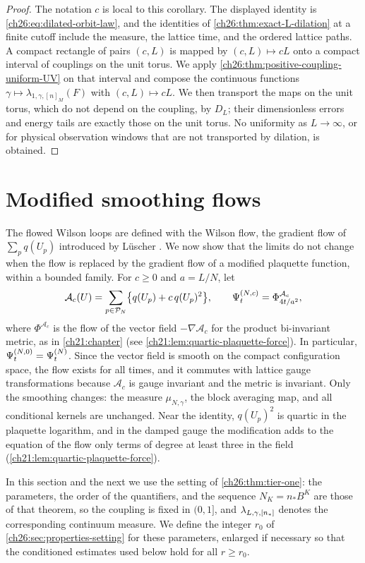 \begin{proof}
The notation $c$ is local to this corollary. The displayed identity is \eqref{ch26:eq:dilated-orbit-law}, and the identities of \cref{ch26:thm:exact-L-dilation} at a finite cutoff include the measure, the lattice time, and the ordered lattice paths. A compact rectangle of pairs $(c,L)$ is mapped by $(c,L)\mapsto cL$ onto a compact interval of couplings on the unit torus. We apply \cref{ch26:thm:positive-coupling-uniform-UV} on that interval and compose the continuous functions $\gamma\mapsto\lambda_{1,\gamma,[n]_M}(F)$ with $(c,L)\mapsto cL$. We then transport the maps on the unit torus, which do not depend on the coupling, by $D_L$; their dimensionless errors and energy tails are exactly those on the unit torus. No uniformity as $L\to\infty$, or for physical observation windows that are not transported by dilation, is obtained.
\end{proof}

\section{Modified smoothing flows}\label{ch26:sec:bounded-quartic-flow-addendum}

The flowed Wilson loops are defined with the Wilson flow, the gradient flow of $\sum_pq(U_p)$ introduced by L\"uscher \cite{Luscher2010WilsonFlow}. We now show that the limits do not change when the flow is replaced by the gradient flow of a modified plaquette function, within a bounded family. For $c\ge0$ and $a=L/N$, let
\[
 \mathcal A_c(U)=\sum_{p\in\mathcal P_{N}}\bigl\{q(U_p)+c\,q(U_p)^2\bigr\},\qquad
 \Psi^{(N,c)}_t=\Phi^{\mathcal A_c}_{4t/a^2},
\]
where $\Phi^{\mathcal A_c}$ is the flow of the vector field $-\nabla\mathcal A_c$ for the product bi-invariant metric, as in \cref{ch21:chapter} (see \cref{ch21:lem:quartic-plaquette-force}). In particular, $\Psi^{(N,0)}_t=\Psi^{(N)}_t$. Since the vector field is smooth on the compact configuration space, the flow exists for all times, and it commutes with lattice gauge transformations because $\mathcal A_c$ is gauge invariant and the metric is invariant. Only the smoothing changes: the measure $\mu_{N,\gamma}$, the block averaging map, and all conditional kernels are unchanged. Near the identity, $q(U_p)^2$ is quartic in the plaquette logarithm, and in the damped gauge the modification adds to the equation of the flow only terms of degree at least three in the field (\cref{ch21:lem:quartic-plaquette-force}).

In this section and the next we use the setting of \cref{ch26:thm:tier-one}: the parameters, the order of the quantifiers, and the sequence $N_K=n_*B^K$ are those of that theorem, so the coupling is fixed in $(0,1]$, and $\lambda_{L,\gamma,[n_*]}$ denotes the corresponding continuum measure. We define the integer $r_0$ of \cref{ch26:sec:properties-setting} for these parameters, enlarged if necessary so that the conditioned estimates used below hold for all $r\ge r_0$.

